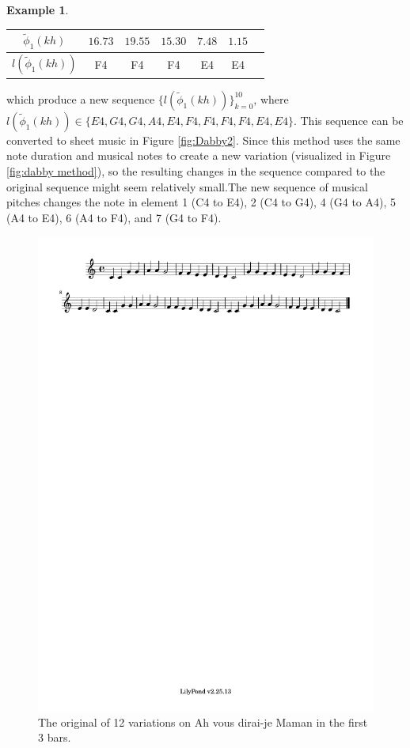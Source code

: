\documentclass[11pt]{article}
\theoremstyle{definition}
\newtheorem{example}[theorem]{Example}
\begin{document}
\begin{example}
\begin{center}
\begin{tabular}{|c||c|c|c|c|c|c|}
\hline
$\tilde{\phi}_1(kh)$ & $16.73$ & $19.55$ & $15.30$ & $7.48$ & $1.15$ & \\
\hline
$l(\tilde{\phi}_1(kh))$ & F4 & F4 & F4 & E4 & E4 &  \\
\hline
\end{tabular}
\end{center}
which produce a new sequence $\{ l(\tilde{\phi}_1(kh)) \}_{k = 0}^{10}$, where $l(\tilde{\phi}_1(kh)) \in \{E4, G4, G4, A4, E4, F4, F4, F4, F4, E4, E4 \}$. This sequence can be converted to sheet music in Figure \ref{fig:Dabby2}. Since this method uses the same note duration and musical notes to create a new variation (visualized in Figure \ref{fig:dabby method}), so the resulting changes in the sequence compared to the original sequence might seem relatively small.The new sequence of musical pitches changes the note in element 1 (C4 to E4), 2 (C4 to G4), 4 (G4 to A4), 5 (A4 to E4), 6 (A4 to F4), and 7 (G4 to F4).

\end{example}

\begin{figure}
\centering
\includegraphics[trim=1cm 26.5cm 10.055cm 0.02cm, clip, scale=1]{dabby_1.pdf} %
\caption{The original of 12 variations on Ah vous dirai-je Maman in the first 3 bars.}
\label{fig:Dabby1} 
\end{figure}
\end{document}
